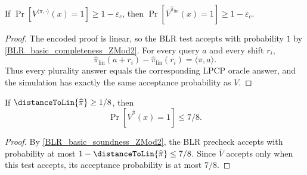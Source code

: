\begin{lemma}[Completeness]
\label{LPCPToPCP.verifier_completeness}
\leanok
If \(\Pr\!\left[V^{\langle \pi, \cdot \rangle}(x)=1\right]\ge 1-\varepsilon_c\), then \(\Pr\!\left[\overline{V}^{\widehat{\pi}_{\mathrm{lin}}}(x)=1\right]\ge 1-\varepsilon_c\).
\end{lemma}
\begin{proof}\leanok
The encoded proof is linear, so the BLR test accepts with probability \(1\) by
\ref{BLR_basic_completeness_ZMod2}. For every query \(a\) and every shift
\(r_i\),
\[
  \widehat{\pi}_{\mathrm{lin}}(a+r_i)-\widehat{\pi}_{\mathrm{lin}}(r_i)
  = \langle \pi,a\rangle.
\]
Thus every plurality answer equals the corresponding LPCP oracle answer, and
the simulation has exactly the same acceptance probability as \(V\).
\end{proof}


\begin{lemma}
\label{LPCPToPCP.verifier_soundness_far_case_of_isFar}
\leanok
If \(\distanceToLin{\widehat{\pi}} \geq  1 / 8\), then
\[
  \Pr[\overline V^{\widehat{\pi}}(x)=1]\leq 7/8 .
\]
\end{lemma}
\begin{proof}\leanok
By \ref{BLR_basic_soundness_ZMod2}, the BLR precheck accepts with probability at most
\(1-\distanceToLin{\widehat{\pi}}\leq 7/8\). Since \(\overline V\) accepts only when this test accepts, its
acceptance probability is at most \(7/8\).
\end{proof}

